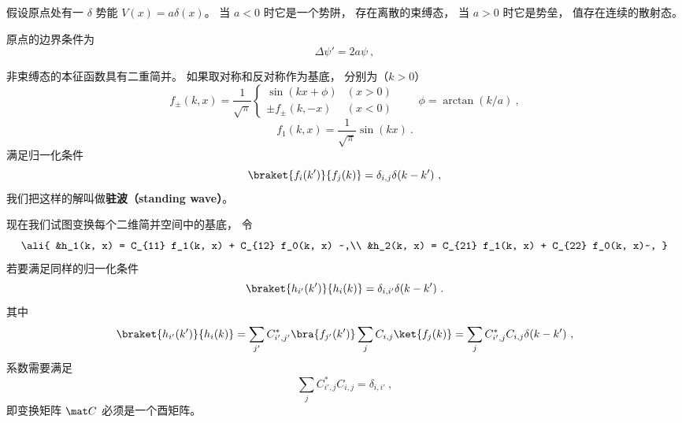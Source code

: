 
\begin{issues}
\issueDraft
\end{issues}


假设原点处有一 $\delta$ 势能 $V(x) = a\delta(x)$。 当 $a < 0$ 时它是一个势阱， 存在离散的束缚态， 当 $a > 0$ 时它是势垒， 值存在连续的散射态。

原点的边界条件为
\begin{equation}
\Delta \psi' = 2a \psi~,
\end{equation}

非束缚态的本征函数具有二重简并。 如果取对称和反对称作为基底， 分别为（$k > 0$）
\begin{equation}
f_\pm(k, x) = \frac{1}{\sqrt{\pi}}
\begin{cases}
\sin(kx + \phi) & (x > 0)\\
\pm f_\pm(k, -x) & (x < 0)
\end{cases}
\qquad  \phi = \arctan(k/a)~,
\end{equation}
\begin{equation}
f_1(k, x) = \frac{1}{\sqrt{\pi}}\sin(kx)~.
\end{equation}
满足归一化条件
\begin{equation}\label{eq_Dsc1D_4}
\braket{f_i(k')}{f_j(k)} = \delta_{i,j} \delta(k - k')~,
\end{equation}
我们把这样的解叫做\textbf{驻波（standing wave）}。

现在我们试图变换每个二维简并空间中的基底， 令
\begin{equation}\ali{
&h_1(k, x) =  C_{11} f_1(k, x) + C_{12} f_0(k, x) ~,\\
&h_2(k, x) =  C_{21} f_1(k, x) + C_{22} f_0(k, x)~,
}\end{equation}
若要满足同样的归一化条件
\begin{equation}\label{eq_Dsc1D_6}
\braket{h_{i'}(k')}{h_i(k)} = \delta_{i,i'}\delta(k - k')~.
\end{equation}
其中
\begin{equation}
\braket{h_{i'}(k')}{h_i(k)} = \sum_{j'} C_{i',j'}^* \bra{f_{j'}(k')} \sum_j C_{i, j} \ket{f_j(k)} = \sum_j C_{i', j}^* C_{i, j} \delta(k - k')~,
\end{equation}
系数需要满足
\begin{equation}
 \sum_j C_{i', j}^* C_{i, j} = \delta_{i, i'}~,
\end{equation}
即变换矩阵 $\mat C$ 必须是一个酉矩阵。


